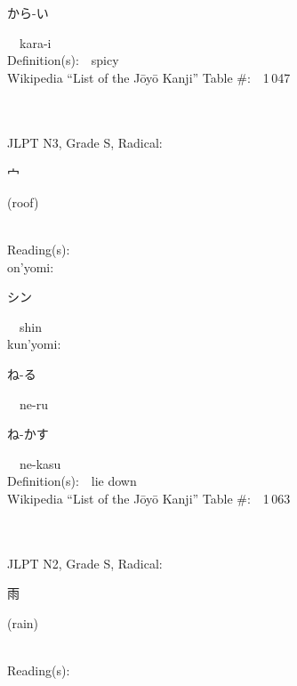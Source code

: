 \begin{multicols}{2}
{\hspace*{2em}}{\begin{CJK}{UTF8}{min} から-い \end{CJK}}\ \ kara-i\ \ \\
Definition(s):\ \ spicy \\
Wikipedia ``List of the J\=oy\=o Kanji'' Table \#:\ \ 1\,047 \\
\ \ \\
{\fontsize{34pt}{40pt}  }\ \ \\  %
{JLPT N3, Grade S, Radical:\ \ {\begin{CJK}{UTF8}{min} 宀 \end{CJK}} (roof) } \\
Reading(s):\ \ \\
{\hspace*{1em}}on'yomi:\ \ \\
{\hspace*{2em}}{\begin{CJK}{UTF8}{min} シン \end{CJK}}\ \ shin\ \ \\
{\hspace*{1em}}kun'yomi:\ \ \\
{\hspace*{2em}}{\begin{CJK}{UTF8}{min} ね-る \end{CJK}}\ \ ne-ru\ \ \\
{\hspace*{2em}}{\begin{CJK}{UTF8}{min} ね-かす \end{CJK}}\ \ ne-kasu\ \ \\
Definition(s):\ \ lie down \\
Wikipedia ``List of the J\=oy\=o Kanji'' Table \#:\ \ 1\,063 \\
\ \ \\
{\fontsize{34pt}{40pt}  }\ \ \\  %
{JLPT N2, Grade S, Radical:\ \ {\begin{CJK}{UTF8}{min} 雨 \end{CJK}} (rain) } \\
Reading(s):\ \ \\

\end{multicols}

